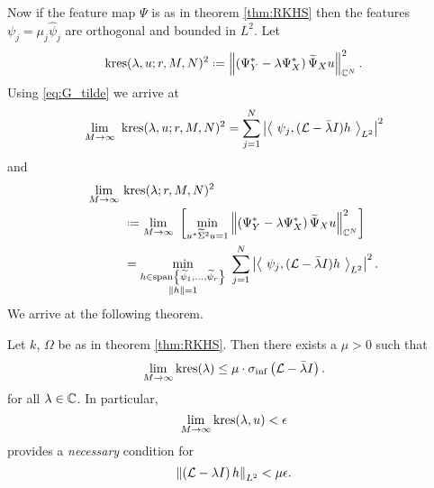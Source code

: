 Now if the feature map $\Psi$ is as in theorem \ref{thm:RKHS} then the features 
$\psi_j = \mu_j \hat{\psi}_j$ are orthogonal and bounded in $L^2$. Let 
\begin{equation}
    \kres (\lambda, u; r, M, N)^2 \defeq 
    \left\| \left( \YY^* - \lambda \YX^* \right) \tYX u \right\|_{\bbC^N}^2 . 
\end{equation}
Using \ref{eq:G_tilde} we arrive at
\begin{equation}
    \lim_{M \to \infty}\ \kres (\lambda, u; r, M, N)^2 = 
    \sum_{j=1}^{N} \left| \left\langle\ 
    \psi_j, (\scrL - \bar{\lambda} I) h \ \right\rangle_{L^2} \right|^2 
\end{equation}
and 
\begin{align}
    \lim_{M \to \infty}\ &\kres (\lambda; r, M, N)^2 \\
    &\defeq \lim_{M \to \infty}\ \left[ \min_{u^* \widetilde{ \Sigma }^2 u = 1} 
    \left\| \left( \YY^* - \lambda \YX^* \right) \tYX u \right\|_{\bbC^N}^2 
    \right]\label{eq:new_res_hat} \\
    &= \min_{\substack{
        h \in \spn \left\{ \widetilde{ \psi }_1, \ldots, \widetilde{ \psi }_r \right\} \\ 
        \left\| h \right\| = 1
    }}\ \sum_{j=1}^{N} \left| \left\langle\ 
        \psi_j, (\scrL - \bar{\lambda} I) h 
    \ \right\rangle_{L^2} \right|^2 . 
\end{align}
We arrive at the following theorem. 

\begin{theorem}
    Let $k$, $\Omega$ be as in theorem \ref{thm:RKHS}. Then there exists a $\mu > 0$ such 
    that
    \begin{equation}
        \lim_{M \to \infty} \text{kres} (\lambda) \leq 
        \mu \cdot \sigma_{\inf} \left( \mathcal{L} - \bar{\lambda} I \right) . 
    \end{equation}
    for all $\lambda \in \mathbb{C}$. In particular, 
    \begin{equation}
        \lim_{M \to \infty} \text{kres} (\lambda, u) < \epsilon
    \end{equation}
    provides a \emph{necessary} condition for 
    \begin{equation}
        \left\| \left( \mathcal{L} - \lambda I \right) h \right\|_{L^2} < \mu \epsilon . 
    \end{equation}
\end{theorem}

